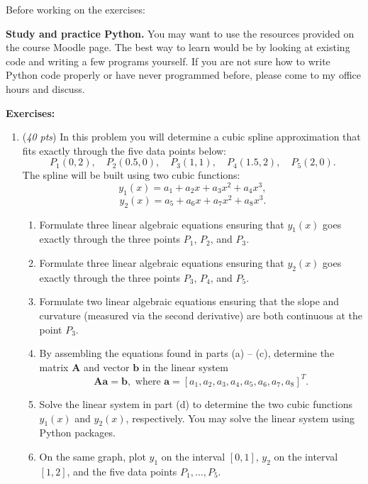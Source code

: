 \documentclass[10pt,twoside]{article}
\renewcommand{\vec}[1]{\mathbf{#1}}
\newcommand{\mat}[1]{\mathbf{#1}}
\begin{document}
Before working on the exercises:

\vspace{0.1in}
\textbf{Study and practice Python.} You may want to use the resources provided on the course Moodle page. The best way to learn would be by looking at existing code and writing a few programs yourself. If you are not sure how to write Python code properly or have never programmed before, please come to my office hours and discuss.

\vspace{0.2in}

\newpage
\textbf{Exercises:}

\vspace{0.1in}


\begin{enumerate}

\item (\emph{40 pts}) In this problem you will determine a cubic spline approximation that fits exactly through the five data points below:
\[
P_1(0, 2), \quad P_2(0.5,0), \quad P_3(1,1), \quad P_4(1.5, 2), \quad P_5(2, 0).
\]
The spline will be built using two cubic functions:
\[
y_1(x) = a_1 + a_2 x + a_3 x^2 + a_4 x^3,
\]
\[
y_2(x) = a_5 + a_6 x + a_7 x^2 + a_8 x^3.
\]
\begin{enumerate}
\item Formulate three linear algebraic equations ensuring that $y_1(x)$ goes exactly through the three points $P_1$, $P_2$, and $P_3$.
\item Formulate three linear algebraic equations ensuring that $y_2(x)$ goes exactly through the three points $P_3$, $P_4$, and $P_5$.
\item Formulate two linear algebraic equations ensuring that the slope and curvature (measured via the second derivative) are both continuous at the point $P_3$.
\item By assembling the equations found in parts (a) -- (c), determine the matrix $\mat{A}$ and vector $\vec{b}$ in the linear system
\[
\mat{A}\vec{a} = \vec{b}, \text{ where } \vec{a} = [a_1, a_2, a_3, a_4, a_5, a_6, a_7, a_8]^T.
\]
\item Solve the linear system in part (d) to determine the two cubic functions $y_1(x)$ and $y_2(x)$, respectively. You may solve the linear system using Python packages.
\item On the same graph, plot $y_1$ on the interval $[0,1]$, $y_2$ on the interval $[1,2]$, and the five data points $P_1, \dots, P_5$.
\end{enumerate}


\end{enumerate}
\end{document}
